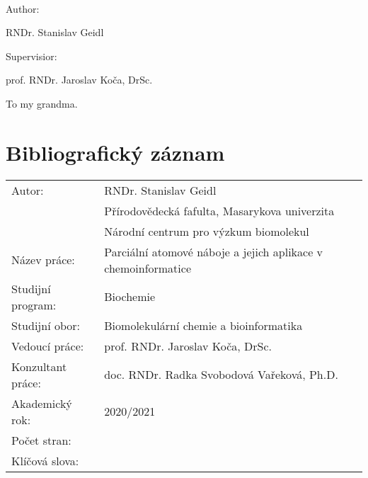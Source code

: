\documentclass[12pt,a4paper,oneside,final]{book}
\begin{document}
 \vspace{8cm}

  \begin{center}
      {\fontsize{28pt}{26pt}\selectfont{Dissertation}}\\
      \vspace{1ex}
      \vspace{6ex}
      {\fontsize{24pt}{26pt}\selectfont{
          Partial Atomic Charges and Their Chemoinformatics Application
      }}
  \end{center}

\vspace*{9mm}

\begin{center}
  Author:

  RNDr. Stanislav Geidl

  Supervisior: 

  prof. RNDr. Jaroslav Koča, DrSc.
\end{center}

\vfill


\begin{center}
{\fontsize{20pt}{28pt}\selectfont{Brno 2021} \hfill \selectfont{Stanislav Geidl}}
\end{center}
\normalsize
\clearpage

\begin{center}
\vspace*{10cm}
To my grandma.
\end{center}
\normalsize
\clearpage

\vfill
\section*{Bibliografický záznam}
\begin{tabular}{ ll } 
  Autor:            & RNDr. Stanislav Geidl \\
                    & Přírodovědecká fafulta, Masarykova univerzita \\
                    & Národní centrum pro výzkum biomolekul \\
  Název práce:      & Parciální atomové náboje a jejich aplikace v chemoinformatice \\ 
  Studijní program: & Biochemie \\
  Studijní obor:    & Biomolekulární chemie a bioinformatika \\
  Vedoucí práce:    & prof. RNDr. Jaroslav Koča, DrSc. \\
  Konzultant práce: & doc. RNDr. Radka Svobodová Vařeková, Ph.D. \\
  Akademický rok:   & 2020/2021 \\
  Počet stran:      & \\
  Klíčová slova:    & \\
\end{tabular}
\clearpage
\end{document}
